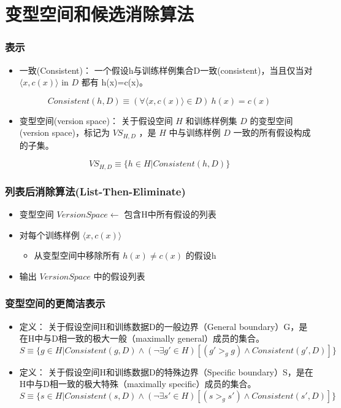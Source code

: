 \documentclass{beamer}
\begin{document}
\section{变型空间和候选消除算法}
\label{sec-3}
\begin{frame}
\frametitle{表示}
\label{sec-3-1}


\begin{itemize}
\item 一致(Consistent)： 一个假设h与训练样例集合D一致(consistent)，当且仅当对 $\langle x, c(x) \rangle$ in $D$ 都有 h(x)=c(x)。
\end{itemize}

\[Consistent(h,D) \equiv (\forall \langle x, c(x) \rangle \in D)\  h(x)=c(x) \]

\begin{itemize}
\item 变型空间(version space)： 关于假设空间 $H$ 和训练样例集 $D$ 的变型空间(version space)，标记为 $VS_{H,D}$ ，是 $H$ 中与训练样例 $D$ 一致的所有假设构成的子集。
\end{itemize}

\[VS_{H,D} \equiv \{h \in H|Consistent(h,D)\} \]
\end{frame}
\begin{frame}
\frametitle{列表后消除算法(List-Then-Eliminate)}
\label{sec-3-2}


\begin{itemize}
\item 变型空间 $VersionSpace\leftarrow$ 包含H中所有假设的列表
\item 对每个训练样例 $\langle x, c(x)\rangle$
\begin{itemize}
\item 从变型空间中移除所有 $h(x)\neq c(x)$ 的假设h
\end{itemize}
\item 输出 $VersionSpace$ 中的假设列表
\end{itemize}
\end{frame}
\begin{frame}
\frametitle{变型空间的更简洁表示}
\label{sec-3-3}


\begin{itemize}
\item 定义： 关于假设空间H和训练数据D的一般边界（General boundary）G，是在H中与D相一致的极大一般（maximally general）成员的集合。
    $S\equiv\{ g\in H | Consistent(g, D)\land(\neg\exists g'\in H)[(g' >_g g)\land Consistent(g', D)]\}$
\item 定义： 关于假设空间H和训练数据D的特殊边界（Specific boundary）S，是在H中与D相一致的极大特殊（maximally specific）成员的集合。
    $S\equiv\{ s\in H | Consistent(s, D)\land(\neg\exists s'\in H)[(s >_g s')\land Consistent(s', D)]\}$
\end{itemize}
\end{frame}
\end{document}
